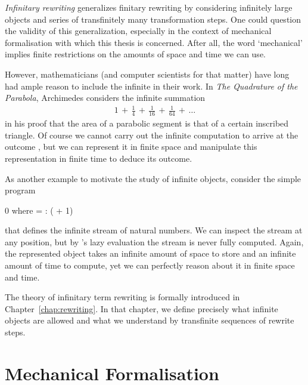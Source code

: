 \emph{Infinitary rewriting} generalizes finitary rewriting by
considering infinitely large objects and series of transfinitely many
transformation steps. One could question the validity of this
generalization, especially in the context of mechanical formalisation
with which this thesis is concerned. After all, the word `mechanical'
implies finite restrictions on the amounts of space and time we can
use.

However, mathematicians (and computer scientists for that matter) have
long had ample reason to include the infinite in their work. In
\emph{The Quadrature of the Parabola}, Archimedes considers the
infinite summation
\begin{align*}
  1 \,+\, \frac{1}{4} \,+\, \frac{1}{16} \,+\, \frac{1}{64} \,+\, \ldots
\end{align*}
in his proof that the area of a parabolic segment is  that
of a certain inscribed triangle. Of course we cannot carry out the
infinite computation to arrive at the outcome , but we can
represent it in finite space and manipulate this representation in
finite time to deduce its outcome.

As another example to motivate the study of infinite objects, consider
the simple \Haskell program
\begin{singlespace}
\begin{coqdoccode}
\coqdocnoindent
{} 0 \coqdocindent{0.2em} \textsf{where}
\coqdocindent{0.2em}   =
 : 
( + 1)\coqdoceol
\end{coqdoccode}
\end{singlespace}
that defines the infinite stream of natural numbers. We can inspect
the stream at any position, but by \Haskell's lazy evaluation the
stream is never fully computed. Again, the represented object takes an
infinite amount of space to store and an infinite amount of time to
compute, yet we can perfectly reason about it in finite space and
time.

The theory of infinitary term rewriting is formally introduced in
Chapter~\ref{chap:rewriting}. In that chapter, we define precisely
what infinite objects are allowed and what we understand by
transfinite sequences of rewrite steps.


\section*{Mechanical Formalisation}

